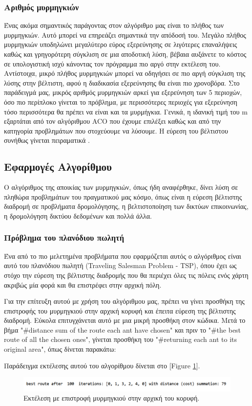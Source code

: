 \subsubsection{Αριθμός μυρμηγκιών}
Ένας ακόμα σημαντικός παράγοντας στον αλγόριθμο μας είναι το πλήθος των μυρμηγκιών. Αυτό μπορεί να επηρεάζει σημαντικά την απόδοσή του. Μεγάλο πλήθος μυρμηγκιών υποδηλώνει μεγαλύτερο εύρος εξερεύνησης σε λιγότερες επαναλήψεις καθώς και γρηγορότερη σύγκλιση σε μια αποδοτική λύση, βέβαια αυξάνετε το κόστος σε υπολογιστική ισχύ κάνοντας τον πρόγραμμα πιο αργό στην εκτέλεση του. Αντίστοιχα, μικρό πλήθος μυρμηγκιών μπορεί να οδηγήσει σε πιο αργή σύγκλιση της λύσης στην βέλτιστη, αφού η διαδικασία εξερεύνησης θα είναι πιο χρονοβόρα. Στο παράδειγμά μας, μικρός αριθμός μυρμηγκιών αρκεί για εξερεύνηση των 5 περιοχών, όσο πιο περίπλοκο γίνεται το πρόβλημα, με περισσότερες περιοχές για εξερεύνηση τόσο περισσότερα θα πρέπει να είναι και τα μυρμήγκια. Γενικά, η ιδανική τιμή του m εξαρτάται από τον αλγόριθμου ACO που έχουμε επιλέξει καθώς και από την κατηγορία προβλημάτων που στοχεύουμε να λύσουμε. Η εύρεση του βέλτιστου συνήθως γίνεται πειραματικά \cite{dorigo2003ant}.


\subsection{Εφαρμογές Αλγορίθμου}
Ο αλγόριθμος της αποικίας των μυρμηγκιών, όπως ήδη αναφέρθηκε, δίνει λύση σε πληθώρα προβλημάτων του πραγματικού μας κόσμο, όπως είναι η εύρεση βέλτιστης διαδρομή σε προβλήματα δρομολόγησης, η βελτιστοποίηση των δικτύων επικοινωνίας, η δρομολόγηση δικτύου δεδομένων και πολλά άλλα. 

\subsubsection{Πρόβλημα του πλανόδιου πωλητή}
Ένα από το πιο μελετημένα προβλήματα που εφαρμόζεται αυτός ο αλγόριθμος είναι αυτό του πλανόδιου πωλητή (Traveling Salesman Problem - TSP), όπου έχει ως στόχο την εύρεση της βέλτιστης διαδρομής που θα περιέχει όλες τις πόλεις ενός χάρτη ακριβώς μία φορά και θα επιστρέφει στην αρχική πόλη. 

Για την επίτευξη αυτού με χρήση του αλγόριθμου μας, πρέπει να γίνει προσθήκη της επιστροφής του μυρμηγκιού στην αρχική κορυφή και έπειτα εύρεση της βέλτιστης διαδρομή. Εύκολα επιτυγχάνεται αυτό με μια μικρή προσθήκη στον κώδικα. Μετά το βήμα "\#distance sum of the route each ant have chosen" και πριν το "\#the best route of all the chosen ones", γίνεται προσθήκη του "\#returning each ant to its original area", όπως δίνεται παρακάτω:

Παράδειγμα εκτέλεσης αυτού του αλγορίθμου δίνεται στο [Figure \ref{exret}].
\begin{figure}
    \centering
    \includegraphics[scale=0.65]{2947_thesis/pictures/ex7.png} 
    \caption{Εκτέλεση με επιστροφή μυρμηγκιού στην αρχική του κορυφή.}
    \label{exret}
\end{figure}

